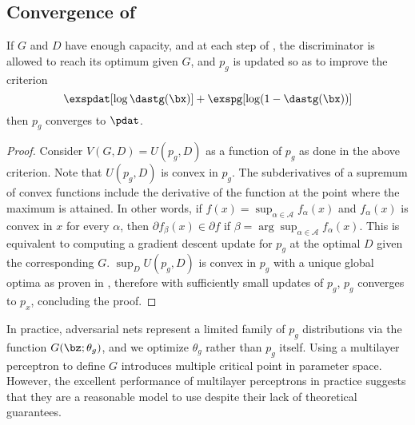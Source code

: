 \subsection{Convergence of %
}
\begin{proposition}
	If $G$ and $D$ have enough capacity, and at each step of %
	, the discriminator is allowed to reach its optimum given $G$, and $p_g$ is updated so as to improve the criterion
	\begin{equation*}
		\exspdat[\log\dastg(\bx)] + \exspg[\log(1-\dastg(\bx))]
	\end{equation*}
	then $p_g$ converges to $\pdat$.%
\end{proposition}

\begin{proof}
	Consider $V(G,D)=U(p_g,D)$ as a function of $p_g$ as done in the above criterion. Note that $U(p_g,D)$ is convex in $p_g$. The subderivatives of a supremum of  convex functions include the derivative of the function at the point where the maximum is attained. In other words, if $f(x)=\sup_{\alpha\in\mathcal{A}}f_{\alpha}(x)$ and $f_{\alpha}(x)$ is convex in $x$ for every $\alpha$, then $\partial f_{\beta}(x)\in\partial f$ if $\beta=\arg\sup_{\alpha\in\mathcal{A}}f_{\alpha}(x)$. This is equivalent to computing a gradient descent update for $p_g$ at the optimal $D$ given the corresponding $G$. $\sup_DU(p_g, D)$ is convex in $p_g$ with a unique global optima as proven in %
	, therefore with sufficiently small updates of $p_g$, $p_g$ converges to $p_x$, concluding the proof.
\end{proof}

In practice, adversarial nets represent a limited family of $p_g$ distributions via the function $G(\bz; \theta_g)$, and we optimize $\theta_g$ rather than $p_g$ itself. Using a multilayer perceptron to define $G$ introduces multiple critical point in parameter space. However, the excellent performance of multilayer perceptrons in practice suggests that they are a reasonable model to use despite their lack of theoretical guarantees.